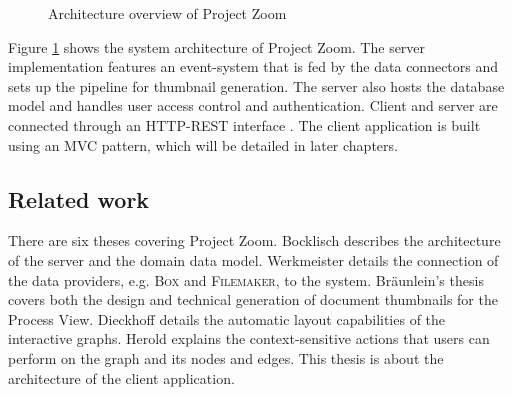 \begin{figure}
\caption{Architecture overview of Project Zoom}
\label{fig:CompleteArchitectureDiagram}
\end{figure}

Figure \ref{fig:CompleteArchitectureDiagram} shows the system architecture of Project Zoom. The server implementation features an event-system that is fed by the data connectors and sets up the pipeline for thumbnail generation. The server also hosts the database model and handles user access control and authentication. Client and server are connected through an HTTP-REST interface \cite{Fielding_2000}. The client application is built using an MVC pattern, which will be detailed in later chapters. 

\subsection{Related work}
There are six theses covering Project Zoom. Bocklisch \cite{Bocklisch_2013} describes the architecture of the server and the domain data model. Werkmeister \cite{Werkmeister_2013} details the connection of the data providers, e.g. \textsc{Box} and \textsc{Filemaker}, to the system. Bräunlein's thesis \cite{Braeunlein_2013} covers both the design and technical generation of document thumbnails for the Process View. Dieckhoff \cite{Dieckhoff_2013} details the automatic layout capabilities of the interactive graphs. Herold \cite{Herold_2013} explains the context-sensitive actions that users can perform on the graph and its nodes and edges. This thesis is about the architecture of the client application.
